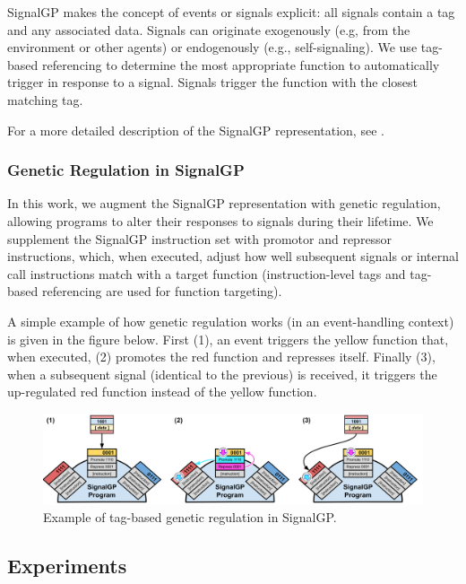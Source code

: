\documentclass[
]{book}
\begin{document}
SignalGP makes the concept of events or signals explicit: all signals contain a tag and any associated
data.
Signals can originate exogenously (e.g, from the environment or other agents) or endogenously (e.g., self-signaling).
We use tag-based referencing to determine the most appropriate function to automatically trigger in
response to a signal.
Signals trigger the function with the closest matching tag.

For a more detailed description of the SignalGP representation, see \citep{lalejini_evolving_2018}.

\hypertarget{genetic-regulation-in-signalgp}{%
\subsubsection{Genetic Regulation in SignalGP}\label{genetic-regulation-in-signalgp}}

In this work, we augment the SignalGP representation with genetic regulation, allowing programs to alter their responses to signals during their lifetime.
We supplement the SignalGP instruction set with promotor and repressor instructions, which, when executed, adjust how well subsequent signals or internal call instructions match with a target function (instruction-level tags and tag-based referencing are used for function targeting).

A simple example of how genetic regulation works (in an event-handling context) is given in the figure below. First (1), an event triggers the yellow function that, when executed, (2) promotes the red function and represses itself. Finally (3), when a subsequent signal (identical to the previous) is received, it triggers the up-regulated red function instead of the yellow function.

\begin{figure}
\centering
\includegraphics{./media/regulation-example-cartoon.png}
\caption{Example of tag-based genetic regulation in SignalGP.}
\end{figure}

\hypertarget{experiments}{%
\subsection{Experiments}\label{experiments}}
\end{document}
